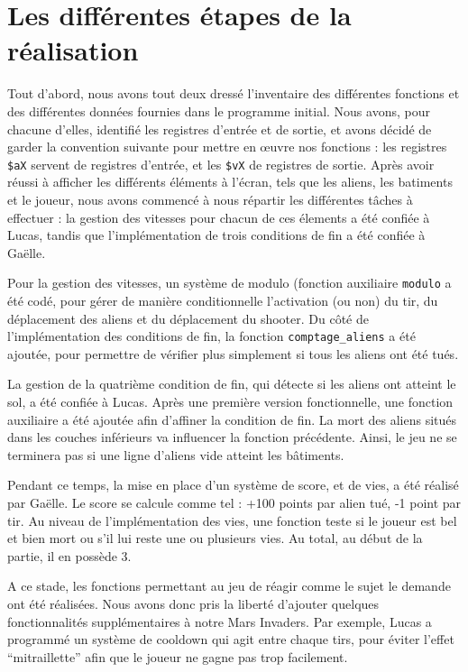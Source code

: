 \documentclass[a4paper,12pt]{report}
\begin{document}
\section*{Les différentes étapes de la réalisation}
Tout d’abord, nous avons tout deux dressé l’inventaire des différentes fonctions et des différentes données fournies dans le programme initial. Nous avons, pour chacune d’elles, identifié les registres d’entrée et de sortie, et avons décidé de garder la convention suivante pour mettre en œuvre nos fonctions : les registres \texttt{\$aX} servent de registres d’entrée, et les \texttt{\$vX} de registres de sortie.
Après avoir réussi à afficher les différents éléments à l’écran, tels que les aliens, les batiments et le joueur, nous avons commencé à nous répartir les différentes tâches à effectuer : la gestion des vitesses pour chacun de ces élements a été confiée à Lucas, tandis que l’implémentation de trois conditions de fin a été confiée à Gaëlle.\par
\vskip 0.75cm
Pour la gestion des vitesses, un système de modulo (fonction auxiliaire \texttt{modulo} a été codé, pour gérer de manière conditionnelle l'activation (ou non) du tir, du déplacement des aliens et du déplacement du shooter.
Du côté de l'implémentation des conditions de fin, la fonction \texttt{comptage\_aliens} a été ajoutée, pour permettre de vérifier plus simplement si tous les aliens ont été tués.\par
La gestion de la quatrième condition de fin, qui détecte si les aliens ont atteint le sol, a été confiée à Lucas. Après une première version fonctionnelle, une fonction auxiliaire a été ajoutée afin d’affiner la condition de fin. La mort des aliens situés dans les couches inférieurs va influencer la fonction précédente. Ainsi, le jeu ne se terminera pas si une ligne d’aliens vide atteint les bâtiments.\par
\vskip 0.75cm
Pendant ce temps, la mise en place d’un système de score, et de vies, a été réalisé par Gaëlle.
Le score se calcule comme tel : +100 points par alien tué, -1 point par tir.
Au niveau de l'implémentation des vies, une fonction teste si le joueur est bel et bien mort ou s'il lui reste une ou plusieurs vies. Au total, au début de la partie, il en possède 3.\par
\vskip 0.75cm
A ce stade, les fonctions permettant au jeu de réagir comme le sujet le demande ont été réalisées. Nous avons donc pris la liberté d'ajouter quelques fonctionnalités supplémentaires à notre Mars Invaders.
Par exemple, Lucas a programmé un système de cooldown qui agit entre chaque tirs, pour éviter l'effet ``mitraillette'' afin que le joueur ne gagne pas trop facilement.
\end{document}
